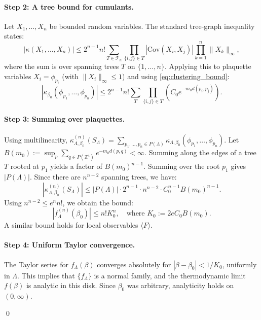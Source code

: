 \paragraph{Step 2: A tree bound for cumulants.}
Let $X_1, \dots, X_n$ be bounded random variables. The standard tree-graph inequality states:
\begin{equation}
|\kappa(X_1, \dots, X_n)| \le 2^{n-1} n! \sum_{T \in \mathcal{T}_n} \prod_{\{i, j\} \in T} |\mathrm{Cov}(X_i, X_j)| \prod_{k=1}^n \|X_k\|_\infty,
\label{eq:tree_bound}
\end{equation}
where the sum is over spanning trees $T$ on $\{1, \dots, n\}$. Applying this to plaquette variables $X_i = \phi_{p_i}$ (with $\|X_i\|_\infty \le 1$) and using \eqref{eq:clustering_bound}:
\begin{equation}
|\kappa_{\beta_0}(\phi_{p_1}, \dots, \phi_{p_n})| \le 2^{n-1} n! \sum_{T} \prod_{\{i, j\} \in T} \left( C_0 e^{-m_0 d(p_i, p_j)} \right).
\end{equation}

\paragraph{Step 3: Summing over plaquettes.}
Using multilinearity, $\kappa_{\Lambda, \beta_0}^{(n)}(S_\Lambda) = \sum_{p_1, \dots, p_n \in P(\Lambda)} \kappa_{\Lambda, \beta_0}(\phi_{p_1}, \dots, \phi_{p_n})$.
Let $B(m_0) := \sup_{p} \sum_{q \in P(\mathbb{Z}^4)} e^{-m_0 d(p, q)} < \infty$. Summing along the edges of a tree $T$ rooted at $p_1$ yields a factor of $B(m_0)^{n-1}$. Summing over the root $p_1$ gives $|P(\Lambda)|$. Since there are $n^{n-2}$ spanning trees, we have:
\begin{equation}
|\kappa_{\Lambda, \beta_0}^{(n)}(S_\Lambda)| \le |P(\Lambda)| \cdot 2^{n-1} \cdot n^{n-2} \cdot C_0^{n-1} B(m_0)^{n-1}.
\end{equation}
Using $n^{n-2} \le e^n n!$, we obtain the bound:
\begin{equation}
|f_\Lambda^{(n)}(\beta_0)| \le n! K_0^n, \quad \text{where } K_0 := 2e C_0 B(m_0).
\end{equation}
A similar bound holds for local observables $\langle F \rangle$.

\paragraph{Step 4: Uniform Taylor convergence.}
The Taylor series for $f_\Lambda(\beta)$ converges absolutely for $|\beta - \beta_0| < 1/K_0$, uniformly in $\Lambda$. This implies that $\{f_\Lambda\}$ is a normal family, and the thermodynamic limit $f(\beta)$ is analytic in this disk. Since $\beta_0$ was arbitrary, analyticity holds on $(0, \infty)$.

\qed
